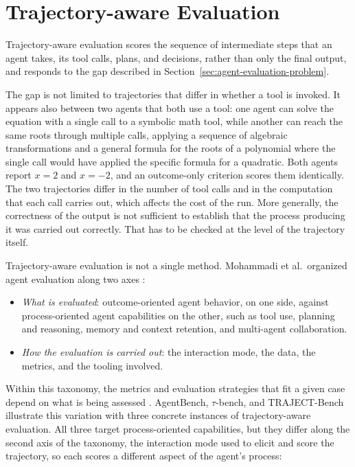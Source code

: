 \section{Trajectory-aware Evaluation}
\label{sec:trajectory-aware-evaluation}

Trajectory-aware evaluation scores the sequence of intermediate steps that an agent takes, its tool calls, plans, and decisions, rather than only the final output, and responds to the gap described in Section~\ref{sec:agent-evaluation-problem}.

The gap is not limited to trajectories that differ in whether a tool is invoked. It appears also between two agents that both use a tool: one agent can solve the equation with a single call to a symbolic math tool, while another can reach the same roots through multiple calls, applying a sequence of algebraic transformations and a general formula for the roots of a polynomial where the single call would have applied the specific formula for a quadratic. Both agents report $x = 2$ and $x = -2$, and an outcome-only criterion scores them identically. The two trajectories differ in the number of tool calls and in the computation that each call carries out, which affects the cost of the run. More generally, the correctness of the output is not sufficient to establish that the process producing it was carried out correctly. That has to be checked at the level of the trajectory itself.

Trajectory-aware evaluation is not a single method. Mohammadi et al.\ organized agent evaluation along two axes \cite{mohammadiEvaluationBenchmarkingLLM2025}:

\begin{itemize}
    \item \emph{What is evaluated}: outcome-oriented agent behavior, on one side, against process-oriented agent capabilities on the other, such as tool use, planning and reasoning, memory and context retention, and multi-agent collaboration.
    \item \emph{How the evaluation is carried out}: the interaction mode, the data, the metrics, and the tooling involved.
\end{itemize}

Within this taxonomy, the metrics and evaluation strategies that fit a given case depend on what is being assessed \cite{mohammadiEvaluationBenchmarkingLLM2025}. AgentBench, $\tau$-bench, and TRAJECT-Bench illustrate this variation with three concrete instances of trajectory-aware evaluation. All three target process-oriented capabilities, but they differ along the second axis of the taxonomy, the interaction mode used to elicit and score the trajectory, so each scores a different aspect of the agent's process:

